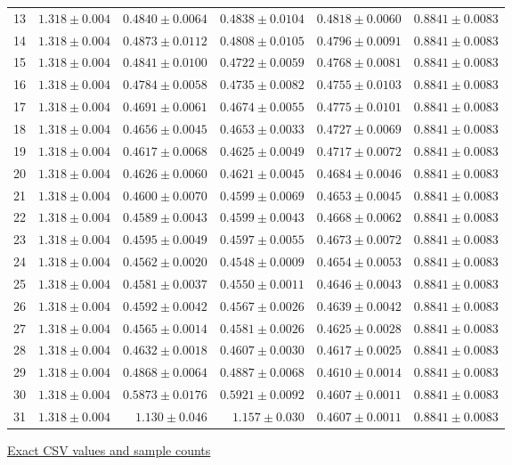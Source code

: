 \begin{center}
{\begin{tabular}{lrrrrr}
13 & $1.318\pm0.004$ & $0.4840\pm0.0064$ & $0.4838\pm0.0104$ & $0.4818\pm0.0060$ & $0.8841\pm0.0083$ \\
14 & $1.318\pm0.004$ & $0.4873\pm0.0112$ & $0.4808\pm0.0105$ & $0.4796\pm0.0091$ & $0.8841\pm0.0083$ \\
15 & $1.318\pm0.004$ & $0.4841\pm0.0100$ & $0.4722\pm0.0059$ & $0.4768\pm0.0081$ & $0.8841\pm0.0083$ \\
16 & $1.318\pm0.004$ & $0.4784\pm0.0058$ & $0.4735\pm0.0082$ & $0.4755\pm0.0103$ & $0.8841\pm0.0083$ \\
17 & $1.318\pm0.004$ & $0.4691\pm0.0061$ & $0.4674\pm0.0055$ & $0.4775\pm0.0101$ & $0.8841\pm0.0083$ \\
18 & $1.318\pm0.004$ & $0.4656\pm0.0045$ & $0.4653\pm0.0033$ & $0.4727\pm0.0069$ & $0.8841\pm0.0083$ \\
19 & $1.318\pm0.004$ & $0.4617\pm0.0068$ & $0.4625\pm0.0049$ & $0.4717\pm0.0072$ & $0.8841\pm0.0083$ \\
20 & $1.318\pm0.004$ & $0.4626\pm0.0060$ & $0.4621\pm0.0045$ & $0.4684\pm0.0046$ & $0.8841\pm0.0083$ \\
21 & $1.318\pm0.004$ & $0.4600\pm0.0070$ & $0.4599\pm0.0069$ & $0.4653\pm0.0045$ & $0.8841\pm0.0083$ \\
22 & $1.318\pm0.004$ & $0.4589\pm0.0043$ & $0.4599\pm0.0043$ & $0.4668\pm0.0062$ & $0.8841\pm0.0083$ \\
23 & $1.318\pm0.004$ & $0.4595\pm0.0049$ & $0.4597\pm0.0055$ & $0.4673\pm0.0072$ & $0.8841\pm0.0083$ \\
24 & $1.318\pm0.004$ & $0.4562\pm0.0020$ & $0.4548\pm0.0009$ & $0.4654\pm0.0053$ & $0.8841\pm0.0083$ \\
25 & $1.318\pm0.004$ & $0.4581\pm0.0037$ & $0.4550\pm0.0011$ & $0.4646\pm0.0043$ & $0.8841\pm0.0083$ \\
26 & $1.318\pm0.004$ & $0.4592\pm0.0042$ & $0.4567\pm0.0026$ & $0.4639\pm0.0042$ & $0.8841\pm0.0083$ \\
27 & $1.318\pm0.004$ & $0.4565\pm0.0014$ & $0.4581\pm0.0026$ & $0.4625\pm0.0028$ & $0.8841\pm0.0083$ \\
28 & $1.318\pm0.004$ & $0.4632\pm0.0018$ & $0.4607\pm0.0030$ & $0.4617\pm0.0025$ & $0.8841\pm0.0083$ \\
29 & $1.318\pm0.004$ & $0.4868\pm0.0064$ & $0.4887\pm0.0068$ & $0.4610\pm0.0014$ & $0.8841\pm0.0083$ \\
30 & $1.318\pm0.004$ & $0.5873\pm0.0176$ & $0.5921\pm0.0092$ & $0.4607\pm0.0011$ & $0.8841\pm0.0083$ \\
31 & $1.318\pm0.004$ & $1.130\pm0.046$ & $1.157\pm0.030$ & $0.4607\pm0.0011$ & $0.8841\pm0.0083$ \\
\bottomrule\end{tabular}}
{\footnotesize\href{https://github.com/sanjeevkrishnaa/Compiler-Driven-ACE/blob/codex/ace-scheduler-correctness/docs/latex/qft96_final/data/allocation_mesh_shortest_reliable_m32.csv}{Exact CSV values and sample counts}}
\end{center}

